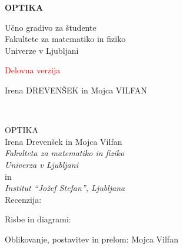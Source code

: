 \documentclass[11pt,fleqn]{book} %
\begin{document}
                
\let\cleardoublepage\clearpage
\makeatletter
\setlength{\@fptop}{0pt}
\makeatother




\begingroup
\thispagestyle{empty}
\centering
\vspace*{5cm}
\par\normalfont\fontsize{35}{35}\sffamily\selectfont
\textbf{OPTIKA}
{\LARGE }\par %
\vspace*{1cm}
{\LARGE Učno gradivo za študente \\
Fakultete za matematiko in fiziko \\
Univerze v Ljubljani}\par %
\vspace*{1cm}
{\LARGE \textcolor{red}{Delovna verzija}}\par
\vspace*{8cm}
{\Large Irena DREVENŠEK in Mojca VILFAN}\par %
\endgroup


\newpage
~\vfill
\thispagestyle{empty}

OPTIKA \\

Irena Drevenšek in Mojca Vilfan \\

{\it Fakulteta za matematiko in fiziko\\
Univerza v Ljubljani}\\
in\\
{\it Institut ``Jožef Stefan'', Ljubljana}\\
 
 Recenzija:  \linebreak[1]%

 Risbe in diagrami: \linebreak[1] %
 
 Oblikovanje, postavitev in prelom: Mojca Vilfan \linebreak[1] %
\end{document}
